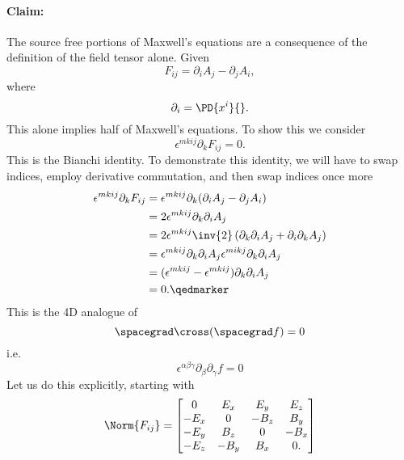 \paragraph{Claim: } The source free portions of Maxwell's equations are a consequence of the definition of the field tensor alone.
Given
\begin{equation}\label{eqn:relativisticElectrodynamicsL11:670}
F_{i j} = \partial_i A_j - \partial_j A_i,
\end{equation}
where
\begin{equation}\label{eqn:relativisticElectrodynamicsL11:690}
\partial_i = \PD{x^i}{}.
\end{equation}
%
This alone implies half of Maxwell's equations.  To show this we consider
%
\begin{equation}\label{eqn:relativisticElectrodynamicsL11:710}
\epsilon^{m k i j} \partial_k F_{i j} = 0.
\end{equation}
%
This is the Bianchi identity.  To demonstrate this identity, we will have to swap indices, employ derivative commutation, and then swap indices once more
%
\begin{equation}\label{eqn:relativisticElectrodynamicsL11b:1380}
\begin{aligned}
\epsilon^{m k i j} \partial_k F_{i j}
&= \epsilon^{m k i j} \partial_k (\partial_i A_j - \partial_j A_i) \\
&= 2 \epsilon^{m k i j} \partial_k \partial_i A_j \\
&= 2 \epsilon^{m k i j} \inv{2} \left( \partial_k \partial_i A_j + \partial_i \partial_k A_j \right) \\
&=
\epsilon^{m k i j} \partial_k \partial_i A_j
\epsilon^{m i k j} \partial_k \partial_i A_j  \\
&=
(\epsilon^{m k i j} - \epsilon^{m k i j}) \partial_k \partial_i A_j \\
&= 0. \qedmarker
\end{aligned}
\end{equation}
%
This is the 4D analogue of
%
\begin{equation}\label{eqn:relativisticElectrodynamicsL11:790}
\spacegrad \cross (\spacegrad f) = 0
\end{equation}
%
i.e.
%
\begin{equation}\label{eqn:relativisticElectrodynamicsL11:810}
\epsilon^{\alpha\beta\gamma} \partial_\beta \partial_\gamma f = 0
\end{equation}
%
Let us do this explicitly, starting with
%
\begin{equation}\label{eqn:relativisticElectrodynamicsL11:370b}
\Norm{ F_{i j} } =
\begin{bmatrix}
0 & E_x & E_y & E_z \\
-E_x & 0 & -B_z & B_y \\
-E_y & B_z & 0 & -B_x \\
-E_z & -B_y & B_x & 0.
\end{bmatrix}
\end{equation}
